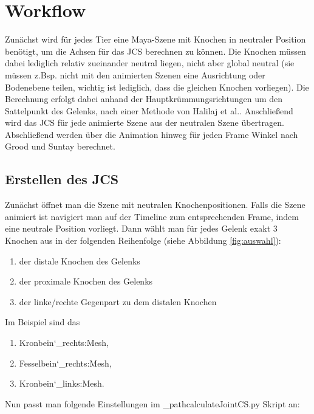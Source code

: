 \documentclass[a4paper, openany, oneside]{memoir}
\begin{document}
\chapter{Workflow}

Zunächst wird für jedes Tier eine Maya-Szene mit Knochen in neutraler Position benötigt, um die Achsen für das JCS berechnen zu können. Die Knochen müssen dabei lediglich relativ zueinander neutral liegen, nicht aber global neutral (sie müssen z.Bsp. nicht mit den animierten Szenen eine Ausrichtung oder Bodenebene teilen, wichtig ist lediglich, dass die gleichen Knochen vorliegen). Die Berechnung erfolgt dabei anhand der Hauptkrümmungsrichtungen um den Sattelpunkt des Gelenks, nach einer Methode von Halilaj et al.\cite{Halilaj2013}. Anschließend wird das JCS für jede animierte Szene aus der neutralen Szene übertragen. Abschließend werden über die Animation hinweg für jeden Frame Winkel nach Grood und Suntay\cite{grood1983joint} berechnet.

\section{Erstellen des JCS}
Zunächst öffnet man die Szene mit neutralen Knochenpositionen. Falls die Szene animiert ist navigiert man auf der Timeline zum entsprechenden Frame, indem eine neutrale Position vorliegt. Dann wählt man für jedes Gelenk exakt 3 Knochen aus in der folgenden Reihenfolge (siehe Abbildung \ref{fig:auswahl}):
\begin{enumerate}
\item der distale Knochen des Gelenks
\item der proximale Knochen des Gelenks
\item der linke/rechte Gegenpart zu dem distalen Knochen
\end{enumerate}
Im Beispiel sind das 
\begin{enumerate}
\item Kronbein\char`_rechts:Mesh, 
\item Fesselbein\char`_rechts:Mesh, 
\item Kronbein\char`_links:Mesh.
\end{enumerate} 
Nun passt man folgende Einstellungen im \File_path{calculateJointCS.py} Skript an:
\end{document}
